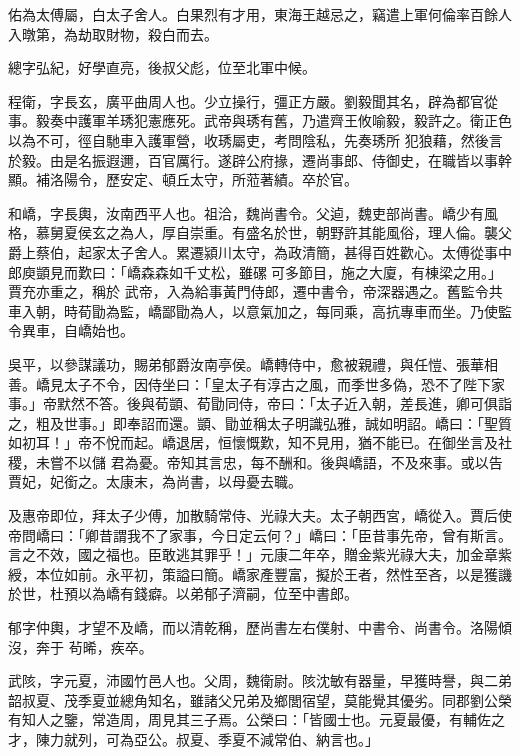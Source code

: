 \begin{pinyinscope}
 佑為太傅屬，白太子舍人。白果烈有才用，東海王越忌之，竊遣上軍何倫率百餘人入暾第，為劫取財物，殺白而去。



 總字弘紀，好學直亮，後叔父彪，位至北軍中候。



 程衛，字長玄，廣平曲周人也。少立操行，彊正方嚴。劉毅聞其名，辟為都官從事。毅奏中護軍羊琇犯憲應死。武帝與琇有舊，乃遣齊王攸喻毅，毅許之。衛正色以為不可，徑自馳車入護軍營，收琇屬吏，考問陰私，先奏琇所
 犯狼藉，然後言於毅。由是名振遐邇，百官厲行。遂辟公府掾，遷尚事郎、侍御史，在職皆以事幹顯。補洛陽令，歷安定、頓丘太守，所蒞著績。卒於官。



 和嶠，字長輿，汝南西平人也。祖洽，魏尚書令。父逌，魏吏部尚書。嶠少有風格，慕舅夏侯玄之為人，厚自崇重。有盛名於世，朝野許其能風俗，理人倫。襲父爵上蔡伯，起家太子舍人。累遷潁川太守，為政清簡，甚得百姓歡心。太傅從事中郎庾顗見而歎曰：「嶠森森如千丈松，雖磥可多節目，施之大廈，有棟梁之用。」賈充亦重之，稱於
 武帝，入為給事黃門侍郎，遷中書令，帝深器遇之。舊監令共車入朝，時荀勖為監，嶠鄙勖為人，以意氣加之，每同乘，高抗專車而坐。乃使監令異車，自嶠始也。



 吳平，以參謀議功，賜弟郁爵汝南亭侯。嶠轉侍中，愈被親禮，與任愷、張華相善。嶠見太子不令，因侍坐曰：「皇太子有淳古之風，而季世多偽，恐不了陛下家事。」帝默然不答。後與荀顗、荀勖同侍，帝曰：「太子近入朝，差長進，卿可俱詣之，粗及世事。」即奉詔而還。顗、勖並稱太子明識弘雅，誠如明詔。嶠曰：「聖質如初耳！」帝不悅而起。嶠退居，恒懷慨歎，知不見用，猶不能已。在御坐言及社稷，未嘗不以儲
 君為憂。帝知其言忠，每不酬和。後與嶠語，不及來事。或以告賈妃，妃銜之。太康末，為尚書，以母憂去職。



 及惠帝即位，拜太子少傅，加散騎常侍、光祿大夫。太子朝西宮，嶠從入。賈后使帝問嶠曰：「卿昔謂我不了家事，今日定云何？」嶠曰：「臣昔事先帝，曾有斯言。言之不效，國之福也。臣敢逃其罪乎！」元康二年卒，贈金紫光祿大夫，加金章紫綬，本位如前。永平初，策謚曰簡。嶠家產豐富，擬於王者，然性至吝，以是獲譏於世，杜預以為嶠有錢癖。以弟郁子濟嗣，位至中書郎。



 郁字仲輿，才望不及嶠，而以清乾稱，歷尚書左右僕射、中書令、尚書令。洛陽傾沒，奔于
 茍晞，疾卒。



 武陔，字元夏，沛國竹邑人也。父周，魏衛尉。陔沈敏有器量，早獲時譽，與二弟韶叔夏、茂季夏並總角知名，雖諸父兄弟及鄉閭宿望，莫能覺其優劣。同郡劉公榮有知人之鑒，常造周，周見其三子焉。公榮曰：「皆國士也。元夏最優，有輔佐之才，陳力就列，可為亞公。叔夏、季夏不減常伯、納言也。」




\end{pinyinscope}
